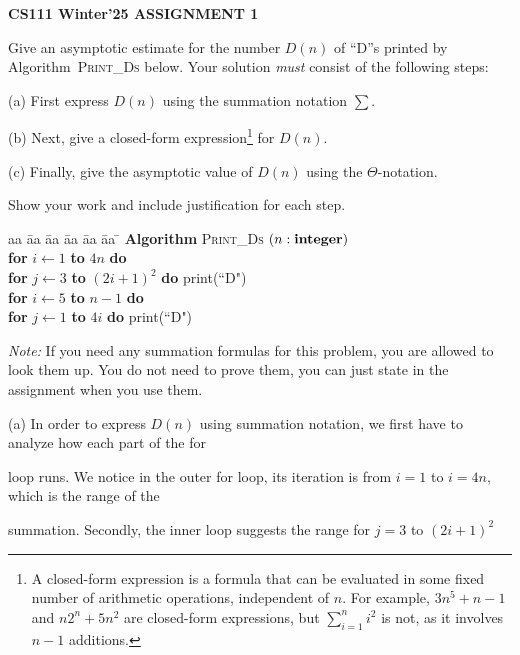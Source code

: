 \documentclass{article}
\begin{document}
\centerline{\large \bf CS111 Winter'25 ASSIGNMENT 1}

\vskip 0.2in


\begin{problem}
Give an asymptotic estimate  for the number $D(n)$ of ``D''s printed by Algorithm~\textsc{Print\_Ds} below.
Your solution \emph{must} consist of the following steps:
%
\begin{description} \setlength{\itemsep}{-0.01in}
\item{(a)} First express $D(n)$ using the summation notation $\sum$.
\item{(b)} Next, give a closed-form expression\footnote{A closed-form expression is a formula that can be evaluated
            in some fixed number of arithmetic operations, independent of $n$. For example, $3n^5+n-1$ and $n2^n+5n^2$
            are closed-form expressions, but $\sum_{i=1}^n i^2$ is not, as it involves $n-1$ additions.}
    for $D(n)$. 
\item{(c)}  Finally, give the asymptotic value of $D(n)$ using the $\Theta$-notation.
\end{description}
\noindent
Show your work and include justification for each step. 

\begin{tabbing}
aa \= aa \= aa \= aa \= aa \= aa \= \kill
\textbf{Algorithm} \textsc{Print\_Ds} $(n: \mbox{\bf integer})$ \\
      \> \textbf{for} $i \leftarrow 1$ \textbf{to} $4n$ \textbf{do} \\
      \> \> \textbf{for} $j \leftarrow 3$ \textbf{to} $(2i+1)^2$ \textbf{do} print(``D") \\
      \> \textbf{for} $i \leftarrow 5$ \textbf{to} $n-1$
                         \textbf{do} \\
      \> \> \textbf{for} $j \leftarrow 1$ \textbf{to} $4i$ \textbf{do}  print(``D") 
\end{tabbing}
\smallskip
\noindent
\emph{Note:} If you need any summation formulas for this problem, you are allowed to look them up. You do not need to
prove them, you can just state in the assignment when you use them.
\begin{description} \setlength{\itemsep}{-0.01in}
\item{(a)} In order to express $D(n)$ using summation notation, we first have to analyze how each part of the for
\item loop runs. We notice in the outer for loop, its iteration is from $i=1$ to $i=4n$, which is the range of the
\item summation. Secondly, the inner loop suggests the range for $j=3$ to $(2i+1)^2$
\end{description}
\noindent
\end{problem}
\end{document}
